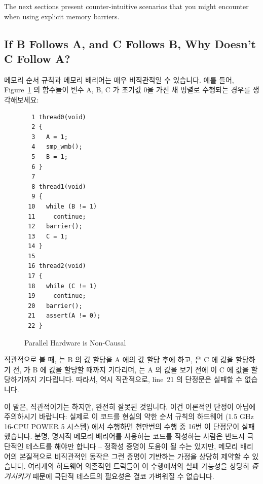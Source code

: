 The next sections present counter-intuitive scenarios that you might
encounter when using explicit memory barriers.
\fi

\subsection{If B Follows A, and C Follows B, Why Doesn't C Follow A?}
\label{sec:advsync:If B Follows A, and C Follows B, Why Doesn't C Follow A?}

메모리 순서 규칙과 메모리 배리어는 매우 비직관적일 수 있습니다.
예를 들어, Figure~\ref{fig:advsync:Parallel Hardware is Non-Causal} 의 함수들이
변수 A, B, C 가 초기값 0을 가진 채 병렬로 수행되는 경우를 생각해보세요:

\begin{figure}[htbp]
{ \centering
\scriptsize
\begin{verbatim}
  1 thread0(void)
  2 {
  3   A = 1;
  4   smp_wmb();
  5   B = 1;
  6 }
  7
  8 thread1(void)
  9 {
 10   while (B != 1)
 11     continue;
 12   barrier();
 13   C = 1;
 14 }
 15
 16 thread2(void)
 17 {
 18   while (C != 1)
 19     continue;
 20   barrier();
 21   assert(A != 0);
 22 }
\end{verbatim}
}
\caption{Parallel Hardware is Non-Causal}
\label{fig:advsync:Parallel Hardware is Non-Causal}
\end{figure}

직관적으로 볼 때,  는 B 의 값 할당을 A 에의 값 할당 후에 하고,
 은 C 에 값을 할당하기 전,  가 B 에 값을 할당할
때까지 기다리며,  는 A 의 값을 보기 전에  이 C 에
값을 할당하기까지 기다립니다.
따라서, 역시 직관적으로, line~21 의 단정문은 실패할 수 없습니다.

이 말은, 직관적이기는 하지만, 완전히 잘못된 것입니다.
이건 이론적인 단정이 아님에 주의하시기 바랍니다: 실제로 이 코드를 현실의 약한
순서 규칙의 하드웨어 (1.5 GHz 16-CPU POWER 5 시스템) 에서 수행하면 천만번의
수행 중 16번 이 단정문이 실패했습니다.
분명, 명시적 메모리 배리어를 사용하는 코드를 작성하는 사람은 반드시 극단적인
테스트를 해야만 합니다 -- 정확성 증명이 도움이 될 수는 있지만, 메모리 배리어의
본질적으로 비직관적인 동작은 그런 증명이 기반하는 가정을 상당히 제약할 수
있습니다.
여러개의 하드웨어 의존적인 트릭들이 이 수행에서의 실패 가능성을 상당히
\emph{증가시키기} 때문에 극단적 테스트의 필요성은 결코 가벼워질 수 없습니다.
\iffalse

